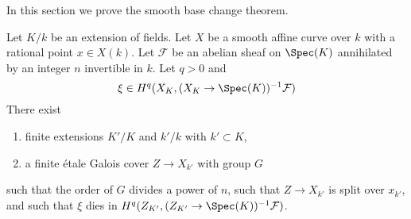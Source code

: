 \noindent
In this section we prove the smooth base change theorem.

\begin{lemma}
\label{lemma-smooth-base-change-fields}
Let $K/k$ be an extension of fields. Let $X$ be a smooth affine curve
over $k$ with a rational point $x \in X(k)$. Let $\mathcal{F}$ be an abelian
sheaf on $\Spec(K)$ annihilated by an integer $n$ invertible in $k$.
Let $q > 0$ and
$$
\xi \in H^q(X_K, (X_K \to \Spec(K))^{-1}\mathcal{F})
$$
There exist
\begin{enumerate}
\item finite extensions $K'/K$ and $k'/k$ with $k' \subset K$,
\item a finite \'etale Galois cover $Z \to X_{k'}$ with group $G$
\end{enumerate}
such that the order of $G$ divides a power of $n$, such that
$Z \to X_{k'}$ is split over $x_{k'}$, and
such that $\xi$ dies in $H^q(Z_{K'}, (Z_{K'} \to \Spec(K))^{-1}\mathcal{F})$.
\end{lemma}

